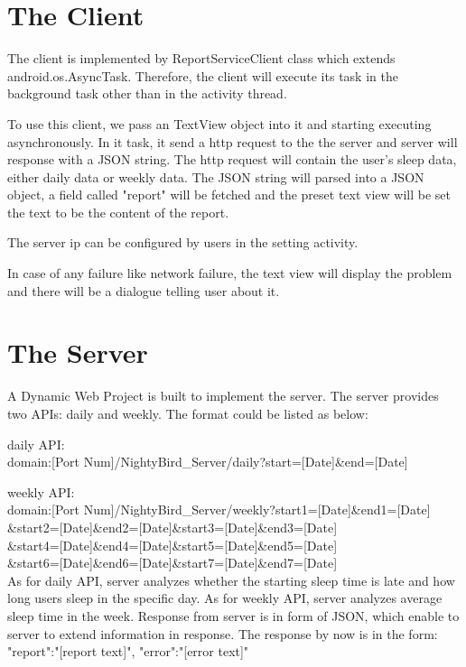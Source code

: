 \documentclass[14pt]{extreport}
\begin{document}
\section{The Client}
The client is implemented by ReportServiceClient class which extends android.os.AsyncTask. Therefore, the client will execute its task in the background task other than in the activity thread.

To use this client, we pass an TextView object into it and starting executing asynchronously. In it task, it send a http request to the the server and server will response with a JSON string.  The http request will contain the user's sleep data, either daily data or weekly data. The JSON string will parsed into a JSON object, a field called "report" will be fetched and the preset text view will be set the text to be the content of the report.

The server ip can be configured by users in the setting activity.

In case of any failure like network failure, the text view will display the problem and there will be a dialogue telling user about it.

\section{The Server}
A Dynamic Web Project is built to implement the server.  The server provides two APIs: daily and weekly. The format could be listed as below:

daily  API:\\
domain:[Port Num]/NightyBird\_Server/daily?start=[Date]\&end=[Date]

weekly API:\\
domain:[Port Num]/NightyBird\_Server/weekly?start1=[Date]\&end1=[Date]\\
\&start2=[Date]\&end2=[Date]\&start3=[Date]\&end3=[Date]\\
\&start4=[Date]\&end4=[Date]\&start5=[Date]\&end5=[Date]\\
\&start6=[Date]\&end6=[Date]\&start7=[Date]\&end7=[Date]\\

As for daily API, server analyzes whether the starting sleep time is late and how long users sleep in the specific day. As for weekly API, server analyzes average sleep time in the week. Response from server is in form of JSON, which enable to server to extend information in response. The response by now is in the form:
{"report":"[report text]", "error":"[error text]"}
\end{document}
